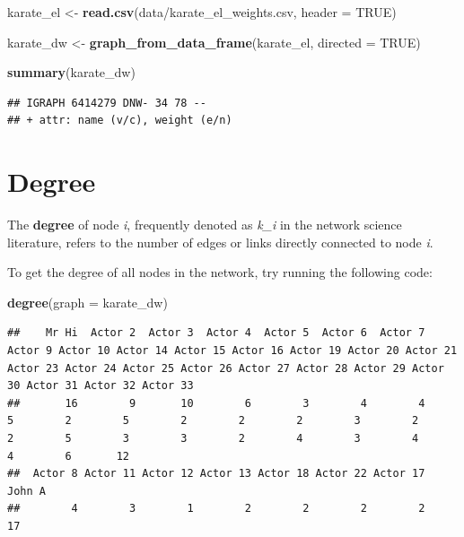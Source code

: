 \documentclass[
]{book}
\newenvironment{Shaded}{\begin{snugshade}}{\end{snugshade}}
\newcommand{\AttributeTok}[1]{\textcolor[rgb]{0.13,0.29,0.53}{#1}}
\newcommand{\ConstantTok}[1]{\textcolor[rgb]{0.56,0.35,0.01}{#1}}
\newcommand{\FunctionTok}[1]{\textcolor[rgb]{0.13,0.29,0.53}{\textbf{#1}}}
\newcommand{\NormalTok}[1]{#1}
\newcommand{\OtherTok}[1]{\textcolor[rgb]{0.56,0.35,0.01}{#1}}
\newcommand{\StringTok}[1]{\textcolor[rgb]{0.31,0.60,0.02}{#1}}
\begin{document}
\begin{Shaded}
\begin{Highlighting}[]
\NormalTok{karate\_el }\OtherTok{\textless{}{-}} \FunctionTok{read.csv}\NormalTok{(}\StringTok{\textquotesingle{}data/karate\_el\_weights.csv\textquotesingle{}}\NormalTok{, }\AttributeTok{header =} \ConstantTok{TRUE}\NormalTok{)}

\NormalTok{karate\_dw }\OtherTok{\textless{}{-}} \FunctionTok{graph\_from\_data\_frame}\NormalTok{(karate\_el, }\AttributeTok{directed =} \ConstantTok{TRUE}\NormalTok{)}

\FunctionTok{summary}\NormalTok{(karate\_dw)}
\end{Highlighting}
\end{Shaded}

\begin{verbatim}
## IGRAPH 6414279 DNW- 34 78 -- 
## + attr: name (v/c), weight (e/n)
\end{verbatim}

\section{Degree}\label{degree}

The \textbf{degree} of node \emph{i}, frequently denoted as \emph{k\_i} in the network science literature, refers to the number of edges or links directly connected to node \emph{i}.

To get the degree of all nodes in the network, try running the following code:

\begin{Shaded}
\begin{Highlighting}[]
\FunctionTok{degree}\NormalTok{(}\AttributeTok{graph =}\NormalTok{ karate\_dw)}
\end{Highlighting}
\end{Shaded}

\begin{verbatim}
##    Mr Hi  Actor 2  Actor 3  Actor 4  Actor 5  Actor 6  Actor 7  Actor 9 Actor 10 Actor 14 Actor 15 Actor 16 Actor 19 Actor 20 Actor 21 Actor 23 Actor 24 Actor 25 Actor 26 Actor 27 Actor 28 Actor 29 Actor 30 Actor 31 Actor 32 Actor 33 
##       16        9       10        6        3        4        4        5        2        5        2        2        2        3        2        2        5        3        3        2        4        3        4        4        6       12 
##  Actor 8 Actor 11 Actor 12 Actor 13 Actor 18 Actor 22 Actor 17   John A 
##        4        3        1        2        2        2        2       17
\end{verbatim}
\end{document}
